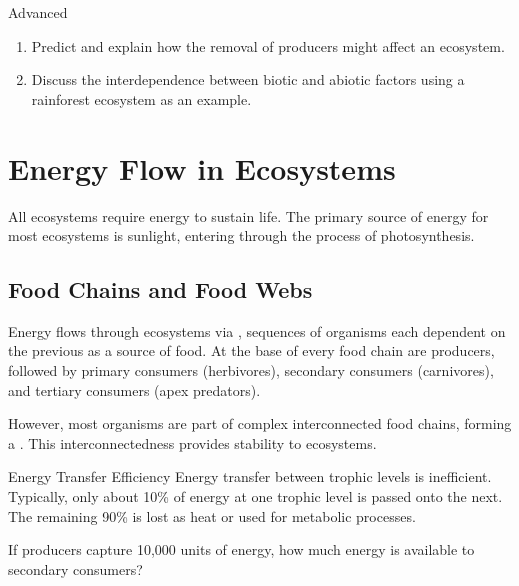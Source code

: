 \begin{tieredquestions}{Advanced}
\begin{enumerate}
    \item Predict and explain how the removal of producers might affect an ecosystem.
    \item Discuss the interdependence between biotic and abiotic factors using a rainforest ecosystem as an example.
\end{enumerate}
\end{tieredquestions}

\section{Energy Flow in Ecosystems}

All ecosystems require energy to sustain life. The primary source of energy for most ecosystems is sunlight, entering through the process of photosynthesis.

\subsection{Food Chains and Food Webs}

Energy flows through ecosystems via , sequences of organisms each dependent on the previous as a source of food. At the base of every food chain are producers, followed by primary consumers (herbivores), secondary consumers (carnivores), and tertiary consumers (apex predators).

However, most organisms are part of complex interconnected food chains, forming a . This interconnectedness provides stability to ecosystems.


\begin{keyconcept}{Energy Transfer Efficiency}
Energy transfer between trophic levels is inefficient. Typically, only about 10\% of energy at one trophic level is passed onto the next. The remaining 90\% is lost as heat or used for metabolic processes.
\end{keyconcept}

\begin{stopandthink}
If producers capture 10,000 units of energy, how much energy is available to secondary consumers?
\end{stopandthink}

